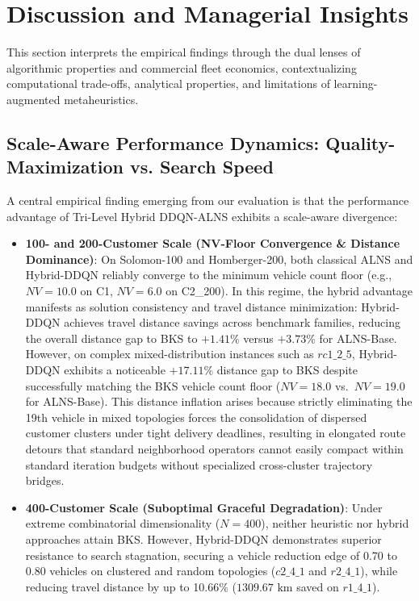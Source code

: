 \documentclass{ieeeaccess}
\begin{document}
\section{Discussion and Managerial Insights}
\label{sec:discussion}

This section interprets the empirical findings through the dual lenses of algorithmic properties and commercial fleet economics, contextualizing computational trade-offs, analytical properties, and limitations of learning-augmented metaheuristics.

\subsection{Scale-Aware Performance Dynamics: Quality-Maximization vs. Search Speed}
\label{sec:disc_scale_aware}

A central empirical finding emerging from our evaluation is that the performance advantage of Tri-Level Hybrid DDQN-ALNS exhibits a scale-aware divergence:
\begin{itemize}
    \item \textbf{100- and 200-Customer Scale (NV-Floor Convergence \& Distance Dominance)}: On Solomon-100 and Homberger-200, both classical ALNS and Hybrid-DDQN reliably converge to the minimum vehicle count floor (e.g., $NV=10.0$ on C1, $NV=6.0$ on C2\_200). In this regime, the hybrid advantage manifests as solution consistency and travel distance minimization: Hybrid-DDQN achieves travel distance savings across benchmark families, reducing the overall distance gap to BKS to $+1.41\%$ versus $+3.73\%$ for ALNS-Base. However, on complex mixed-distribution instances such as $rc1\_2\_5$, Hybrid-DDQN exhibits a noticeable $+17.11\%$ distance gap to BKS despite successfully matching the BKS vehicle count floor ($NV=18.0$ vs.\ $NV=19.0$ for ALNS-Base). This distance inflation arises because strictly eliminating the 19th vehicle in mixed topologies forces the consolidation of dispersed customer clusters under tight delivery deadlines, resulting in elongated route detours that standard neighborhood operators cannot easily compact within standard iteration budgets without specialized cross-cluster trajectory bridges.
    \item \textbf{400-Customer Scale (Suboptimal Graceful Degradation)}: Under extreme combinatorial dimensionality ($N=400$), neither heuristic nor hybrid approaches attain BKS. However, Hybrid-DDQN demonstrates superior resistance to search stagnation, securing a vehicle reduction edge of 0.70 to 0.80 vehicles on clustered and random topologies ($c2\_4\_1$ and $r2\_4\_1$), while reducing travel distance by up to 10.66\% ($1309.67\text{ km}$ saved on $r1\_4\_1$).
\end{itemize}
\end{document}
